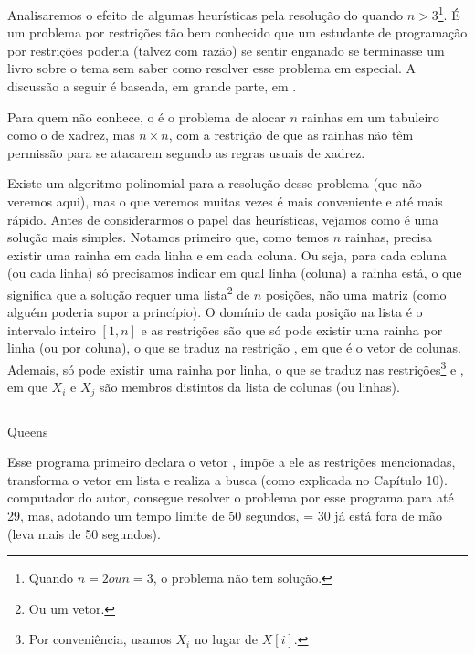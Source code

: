 \documentclass{article}
\begin{document}
Analisaremos o efeito de algumas heurísticas pela resolução do
 quando $n > 3$\footnote{Quando $n
  = 2 ou n = 3$, o problema não tem solução.}. É um problema por
restrições tão bem conhecido que um estudante de programação por
restrições poderia (talvez com razão) se sentir enganado se terminasse
um livro sobre o tema sem saber como resolver esse problema em
especial. A discussão a seguir é baseada, em grande parte, em
\cite{krzysztof}.

Para quem não conhece, o  é o
problema de alocar $n$ rainhas em um tabuleiro como o de xadrez, mas
$n\times n$, com a restrição de que as rainhas não têm permissão para
se atacarem segundo as regras usuais de xadrez.

Existe um algoritmo polinomial para a resolução desse problema (que
não veremos aqui), mas o que veremos muitas vezes é mais conveniente e
até mais rápido. Antes de considerarmos o papel das heurísticas,
vejamos como é uma solução mais simples. Notamos primeiro que, como
temos $n$ rainhas, precisa existir uma rainha em cada linha e em cada
coluna. Ou seja, para cada coluna (ou cada linha) só precisamos
indicar em qual linha (coluna) a rainha está, o que significa que a
solução requer uma lista\footnote{Ou um vetor.} de $n$ posições, não
uma matriz (como alguém poderia supor a princípio). O domínio de cada
posição na lista é o intervalo inteiro $[1,n]$ e as restrições são que
só pode existir uma rainha por linha (ou por coluna), o que se traduz
na restrição , em que  é o vetor
de colunas. Ademais, só pode existir uma rainha por linha, o que se
traduz nas restrições\footnote{Por conveniência, usamos $X_i$ no lugar
  de $X[i]$.}  e
, em que $X_i$ e
$X_j$ são membros distintos da lista de colunas (ou linhas).

\begin{listing}[H]
  \inputminted{prolog}{../Exemplos/Cap11/prog1_queens.ecl}
  \caption{Queens}
\end{listing}

Esse programa primeiro declara o vetor , impõe a ele
as restrições mencionadas, transforma o vetor em lista e realiza a
busca (como explicada no Capítulo 10).%
computador do autor, consegue resolver o problema por esse programa
para  até 29, mas, adotando um tempo limite de 50 segundos,
 = 30 já está fora de mão (leva mais de 50 segundos).
\end{document}
